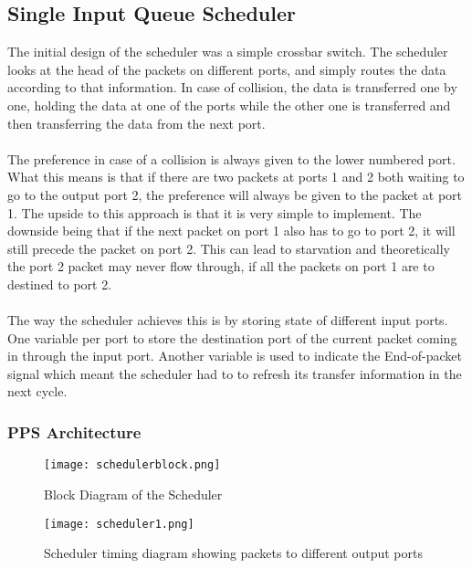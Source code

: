 \documentclass[twoside,12pt,fleqn]{book} %
\begin{document}
\subsection{Single Input Queue Scheduler}
The initial design of the scheduler was a simple crossbar switch. The scheduler looks at the head of the packets on different ports, and simply routes the data according to that information. In case of collision, the data is transferred one by one, holding the data at one of the ports while the other one is transferred and then transferring the data from the next port.\\\\
The preference in case of a collision is always given to the lower numbered port. What this means is that if there are two packets at ports 1 and 2 both waiting to go to the output port 2, the preference will always be given to the packet at port 1. The upside to this approach is that it is very simple to implement. The downside being that if the next packet on port 1 also has to go to port 2, it will still precede the packet on port 2. This can lead to starvation and theoretically the port 2 packet may never flow through, if all the packets on port 1 are to destined to port 2.\\\\
The way the scheduler achieves this is by storing state of different input ports. One variable per port to store the destination port of the current packet coming in through the input port. Another variable is used to indicate the End-of-packet signal which meant the scheduler had to to refresh its transfer information in the next cycle. \\

\subsubsection{PPS Architecture}
\begin{figure}[ht]
    \centering
    \texttt{[image: schedulerblock.png]}
    \caption{Block Diagram of the Scheduler}
    \label{fig:scheduler_block}
\end{figure}

\begin{figure}[ht]
    \centering
    \texttt{[image: scheduler1.png]}
    \caption{Scheduler timing diagram showing packets to different output ports}
    \label{fig:scheduler1}
\end{figure}
\end{document}
